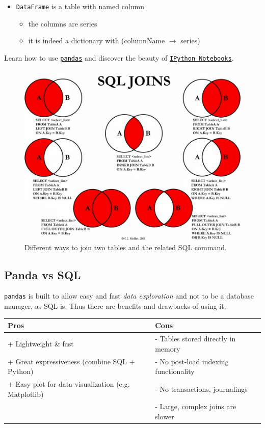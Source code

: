 \begin{itemize} 
 \item \texttt{DataFrame} is a table with named column
  \begin{itemize}
  \item the columns are series
  \item it is indeed a dictionary with (columnName $\rightarrow$ series)
  \end{itemize}  
\end{itemize}

Learn how to use \href{https://github.com/ADAEPFL/Labs/tree/master/02\%20-\%20Intro\%20to\%20Pandas}{\texttt{pandas}} and discover the beauty of \href{https://github.com/ADAEPFL/Labs/tree/master/01\%20-\%20Intro\%20to\%20Tools}{\texttt{IPython Notebooks}}.

\begin{figure}%
 \centering
 \includegraphics[width=12cm]{./img/02/SQL_joins}
 \caption{\label{join_SQL} Different ways to join two tables and the related SQL command.}
\end{figure}


\subsection{Panda vs SQL}

\texttt{pandas} is built to allow easy and fast \emph{data exploration} and not to be a database manager, as SQL is. Thus there are benefits and drawbacks of using it.


\begin{center} %
\begin{tabular} {| l | l |}
\hline
\bf Pros & \bf Cons \\ \hline
+ Lightweight \& fast & - Tables stored directly in memory \\
+ Great expressiveness (combine SQL + Python) & - No post-load indexing functionality\\
+ Easy plot for data visualization (e.g. Matplotlib) & - No transactions, journalings\\ 
& - Large, complex joins are slower \\ \hline
\end{tabular}
\end{center}

